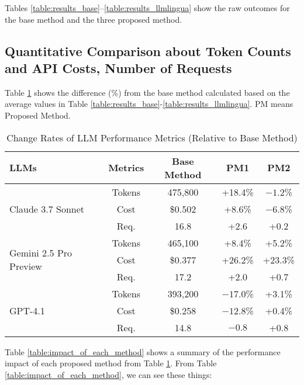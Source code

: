 Tables \ref{table:results_base}–\ref{table:results_llmlingua} show the raw outcomes for the base method and the three proposed method. 


% 
\newpage

\subsection{Quantitative Comparison about Token Counts and API Costs, Number of Requests}

Table \ref{table:quantitative_comparison} shows the difference (\%) from the base method calculated based on the average values in Table \ref{table:results_base}-\ref{table:results_llmlingua}. PM means Proposed Method.

\begin{table}[h!]
    \centering
    \caption{Change Rates of LLM Performance Metrics (Relative to Base Method)}
    \begin{tabular}{lcccc}
        \toprule
        \textbf{LLMs} & \textbf{Metrics} \quad & \textbf{Base Method} & \textbf{PM1} & \textbf{PM2} \\
        \midrule
        \multirow{3}{*}{Claude 3.7 Sonnet} 
          & Tokens & 475{,}800 & \quad +18.4\% & \quad $-1.2$\% \\
          & Cost   & \$0.502 & \quad +8.6\% & \quad $-6.8$\% \\
          & Req.   & 16.8 & \quad +2.6 & \quad +0.2 \\
        \midrule
        \multirow{3}{*}{Gemini 2.5 Pro Preview} 
          & Tokens & 465{,}100 & \quad +8.4\% & \quad +5.2\% \\
          & Cost   & \$0.377 & \quad +26.2\% & \quad +23.3\% \\
          & Req.   & 17.2 & \quad +2.0 & \quad +0.7 \\
        \midrule
        \multirow{3}{*}{GPT-4.1} 
          & Tokens & 393{,}200 & \quad $-17.0$\% & \quad +3.1\% \\
          & Cost   & \$0.258 & \quad $-12.8$\% & \quad +0.4\% \\
          & Req.   & 14.8 & \quad $-0.8$ & \quad +0.8 \\
        \bottomrule
    \end{tabular}
    \label{table:quantitative_comparison}
\end{table}

Table \ref{table:impact_of_each_method} shows a summary of the performance impact of each proposed method from Table \ref{table:quantitative_comparison}. From Table \ref{table:impact_of_each_method}, we can see these things:


